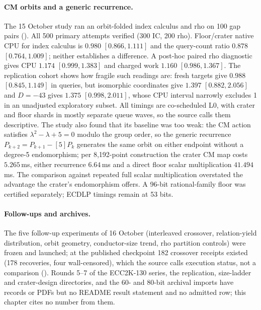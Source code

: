 \paragraph{CM orbits and a generic recurrence.} The 15 October study ran an
orbit-folded index calculus and rho on 100 gap pairs
(). All 500
primary attempts verified (300 IC, 200 rho). Floor/crater native CPU for
index calculus is $0.980$ $[0.866,1.111]$ and the query-count ratio
$0.878$ $[0.764,1.009]$; neither establishes a difference. A post-hoc
paired rho diagnostic gives CPU $1.174$ $[0.999,1.383]$ and charged work
$1.160$ $[0.986,1.367]$. The replication cohort shows how fragile such
readings are: fresh targets give $0.988$ $[0.845,1.149]$ in queries, but
isomorphic coordinates give $1.397$ $[0.882,2.056]$ and $D=-43$ gives
$1.375$ $[0.998,2.011]$, whose CPU interval narrowly excludes 1 in an
unadjusted exploratory subset. All timings are co-scheduled L0, with crater
and floor shards in mostly separate queue waves, so the source calls them
descriptive. The study also found that its baseline was too weak: the CM
action satisfies $\lambda^2-\lambda+5=0$ modulo the group order, so the
generic recurrence $P_{k+2}=P_{k+1}-[5]P_k$ generates the same orbit on
either endpoint without a degree-5 endomorphism; per 8{,}192-point
construction the crater CM map costs $5.265$\,ms, either recurrence
$6.64$\,ms and a direct floor scalar multiplication $41.494$\,ms. The
comparison against repeated full scalar multiplication overstated the
advantage the crater's endomorphism offers. A 96-bit rational-family floor
was certified separately; ECDLP timings remain at 53 bits.

\paragraph{Follow-ups and archives.} The five follow-up experiments of
16 October (interleaved crossover, relation-yield distribution, orbit
geometry, conductor-size trend, rho partition controls) were frozen and
launched; at the published checkpoint 182 crossover receipts existed (178
recoveries, four wall-censored), which the source calls execution status,
not a comparison ().
Rounds 5--7 of the ECC2K-130 series, the replication, size-ladder and
crater-design directories, and the 60- and 80-bit archival imports have
records or PDFs but no README result statement and no admitted row; this
chapter cites no number from them.

